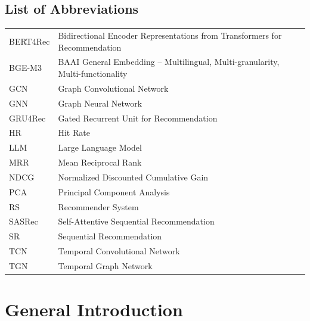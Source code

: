 \documentclass[12pt,a4paper]{report}
\begin{document}
\newpage
\section*{List of Abbreviations}

\vspace{0.5cm}

\noindent
\begin{tabular}{@{}p{} p{}@{}}
BERT4Rec & Bidirectional Encoder Representations from Transformers for Recommendation \\
BGE-M3  & BAAI General Embedding -- Multilingual, Multi-granularity, Multi-functionality \\
GCN     & Graph Convolutional Network \\
GNN     & Graph Neural Network \\
GRU4Rec & Gated Recurrent Unit for Recommendation \\
HR      & Hit Rate \\
LLM     & Large Language Model \\
MRR     & Mean Reciprocal Rank \\
NDCG    & Normalized Discounted Cumulative Gain \\
PCA     & Principal Component Analysis \\
RS      & Recommender System \\
SASRec  & Self-Attentive Sequential Recommendation \\
SR      & Sequential Recommendation \\
TCN     & Temporal Convolutional Network \\
TGN     & Temporal Graph Network \\
\end{tabular}


\newpage
{}

\chapter*{General Introduction}
\end{document}
